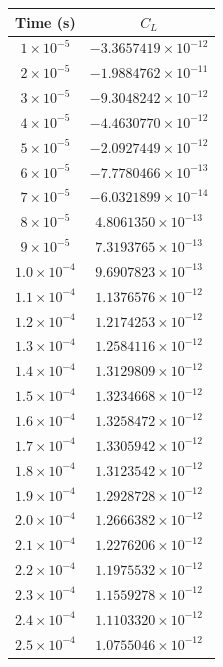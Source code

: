 \begin{table}[H]
	\centering
	\renewcommand{\arraystretch}{1.3}
	\begin{tabular}{|c|c|}
		\hline
		\textbf{Time (s)} & \textbf{$C_L$} \\
		\hline
		$1 \times 10^{-5}$  & $-3.3657419 \times 10^{-12}$ \\
		$2 \times 10^{-5}$  & $-1.9884762 \times 10^{-11}$ \\
		$3 \times 10^{-5}$  & $-9.3048242 \times 10^{-12}$ \\
		$4 \times 10^{-5}$  & $-4.4630770 \times 10^{-12}$ \\
		$5 \times 10^{-5}$  & $-2.0927449 \times 10^{-12}$ \\
		$6 \times 10^{-5}$  & $-7.7780466 \times 10^{-13}$ \\
		$7 \times 10^{-5}$  & $-6.0321899 \times 10^{-14}$ \\
		$8 \times 10^{-5}$  & $4.8061350 \times 10^{-13}$ \\
		$9 \times 10^{-5}$  & $7.3193765 \times 10^{-13}$ \\
		$1.0 \times 10^{-4}$ & $9.6907823 \times 10^{-13}$ \\
		$1.1 \times 10^{-4}$ & $1.1376576 \times 10^{-12}$ \\
		$1.2 \times 10^{-4}$ & $1.2174253 \times 10^{-12}$ \\
		$1.3 \times 10^{-4}$ & $1.2584116 \times 10^{-12}$ \\
		$1.4 \times 10^{-4}$ & $1.3129809 \times 10^{-12}$ \\
		$1.5 \times 10^{-4}$ & $1.3234668 \times 10^{-12}$ \\
		$1.6 \times 10^{-4}$ & $1.3258472 \times 10^{-12}$ \\
		$1.7 \times 10^{-4}$ & $1.3305942 \times 10^{-12}$ \\
		$1.8 \times 10^{-4}$ & $1.3123542 \times 10^{-12}$ \\
		$1.9 \times 10^{-4}$ & $1.2928728 \times 10^{-12}$ \\
		$2.0 \times 10^{-4}$ & $1.2666382 \times 10^{-12}$ \\
		$2.1 \times 10^{-4}$ & $1.2276206 \times 10^{-12}$ \\
		$2.2 \times 10^{-4}$ & $1.1975532 \times 10^{-12}$ \\
		$2.3 \times 10^{-4}$ & $1.1559278 \times 10^{-12}$ \\
		$2.4 \times 10^{-4}$ & $1.1103320 \times 10^{-12}$ \\
		$2.5 \times 10^{-4}$ & $1.0755046 \times 10^{-12}$ \\

\end{tabular}
\end{table}
